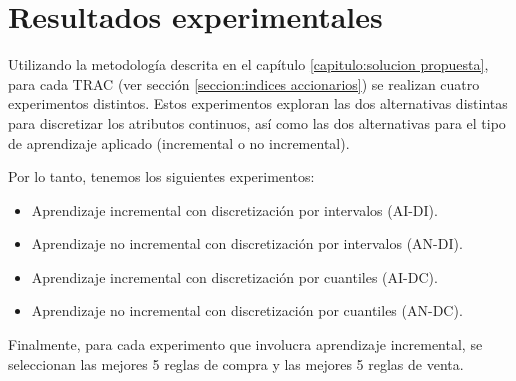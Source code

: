 \documentclass[12pt]{report}
\theoremstyle{break}
\theoremstyle{break}
\begin{document}
\chapter[Capítulo \thechapter: Resultados experimentales]{Resultados experimentales}
\label{capitulo:resultados experimentales}
Utilizando la metodología descrita en el capítulo \ref{capitulo:solucion propuesta}, para cada TRAC (ver sección \ref{seccion:indices accionarios}) se realizan cuatro experimentos distintos. Estos experimentos exploran las dos alternativas distintas para discretizar los atributos continuos, así como las dos alternativas para el tipo de aprendizaje aplicado (incremental o no incremental).

Por lo tanto, tenemos los siguientes experimentos:
\begin{itemize}
\item Aprendizaje incremental con discretización por intervalos (AI-DI).

\item Aprendizaje no incremental con discretización por intervalos (AN-DI).

\item Aprendizaje incremental con discretización por cuantiles (AI-DC).

\item Aprendizaje no incremental con discretización por cuantiles (AN-DC).
\end{itemize}
Finalmente, para cada experimento que involucra aprendizaje incremental, se seleccionan las mejores 5 reglas de compra y las mejores 5 reglas de venta.
\end{document}
